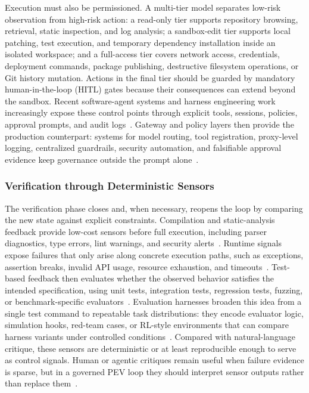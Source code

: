 Execution must also be permissioned. A multi-tier model separates low-risk observation from high-risk action: a read-only tier supports repository browsing, retrieval, static inspection, and log analysis; a sandbox-edit tier supports local patching, test execution, and temporary dependency installation inside an isolated workspace; and a full-access tier covers network access, credentials, deployment commands, package publishing, destructive filesystem operations, or Git history mutation. Actions in the final tier should be guarded by mandatory human-in-the-loop (HITL) gates because their consequences can extend beyond the sandbox. Recent software-agent systems and harness engineering work increasingly expose these control points through explicit tools, sessions, policies, approval prompts, and audit logs~\cite{sergeyuk2026human, wang2025openhands, lin2026agentic, zhou2026externalization,anthropicclaudecodeautomode2026,anthropicsandboxing2026}. Gateway and policy layers then provide the production counterpart: systems for model routing, tool registration, proxy-level logging, centralized guardrails, security automation, and falsifiable approval evidence keep governance outside the prompt alone~\cite{litellm2026,kong2026,portkey2026,contextforge2026,agentgateway2026,openairealtimeagents2026,openaicsagentsdemo2026,tracecat2026,archestra2026,haft2026}.

\subsubsection{Verification through Deterministic Sensors}

The verification phase closes and, when necessary, reopens the loop by comparing the new state against explicit constraints. Compilation and static-analysis feedback provide low-cost sensors before full execution, including parser diagnostics, type errors, lint warnings, and security alerts~\cite{bi2024iterative, adnan2025debugging, blyth2025static}. Runtime signals expose failures that only arise along concrete execution paths, such as exceptions, assertion breaks, invalid API usage, resource exhaustion, and timeouts~\cite{sun2024llm, huang2025mldebugging, zhong2024debug}. Test-based feedback then evaluates whether the observed behavior satisfies the intended specification, using unit tests, integration tests, regression tests, fuzzing, or benchmark-specific evaluators~\cite{chen2023teaching, fakhoury2024llm, gu2024testart, shi2025from}. Evaluation harnesses broaden this idea from a single test command to repeatable task distributions: they encode evaluator logic, simulation hooks, red-team cases, or RL-style environments that can compare harness variants under controlled conditions~\cite{promptfoo2026,deepeval2026,ragas2026,lmevaluationharness2026,langwatch2026,evalscope2026,harbor2026,tau2bench2026,nemogym2026,agentevaluation2026,inspectevals2026}. Compared with natural-language critique, these sensors are deterministic or at least reproducible enough to serve as control signals. Human or agentic critiques remain useful when failure evidence is sparse, but in a governed PEV loop they should interpret sensor outputs rather than replace them~\cite{shinn2023reflexion, ross2023programmer, wu2024autogen}.

